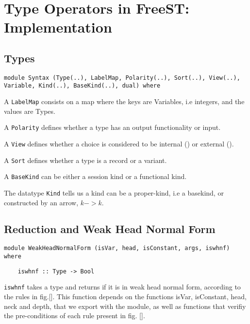 \chapter{Type Operators in FreeST: Implementation}




\section{Types}

\begin{lstlisting}
module Syntax (Type(..), LabelMap, Polarity(..), Sort(..), View(..), Variable, Kind(..), BaseKind(..), dual) where
\end{lstlisting}

A \lstinline{LabelMap} consists on a map where the keys are Variables, i.e integers, and the values are Types.

A \lstinline{Polarity} defines whether a type has an output functionality or input. 

A \lstinline{View} defines whether a choice is considered to be internal () or external ().

A \lstinline{Sort} defines whether a type is a record or a variant.

A \lstinline{BaseKind} can be either a session kind or a functional kind. 

The datatype \lstinline{Kind} tells us a kind can be a proper-kind, i.e a basekind, or constructed by an arrow, $k -> k$.


\section{Reduction and Weak Head Normal Form}

\begin{lstlisting}
module WeakHeadNormalForm (isVar, head, isConstant, args, iswhnf) where
\end{lstlisting}

\begin{lstlisting}
    iswhnf :: Type -> Bool
\end{lstlisting}

\lstinline{iswhnf} takes a type and returns if it is in weak head normal form, according to the rules in fig.[]. This function depends on the functions isVar, isConstant, head, neck and depth, that we export with the module, as well as functions that verifiy the pre-conditions of each rule present in fig. [].

